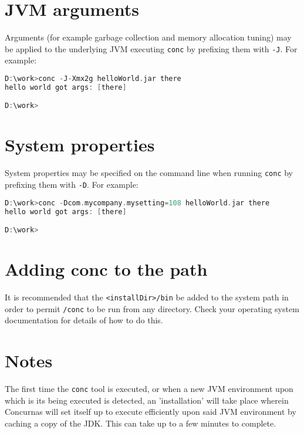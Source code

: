 \documentclass[conc-doc]{subfiles}
\begin{document}
\section{JVM arguments}
Arguments (for example garbage collection and memory allocation tuning) may be applied to the underlying JVM executing \lstinline{conc} by prefixing them with \lstinline{-J}. For example:

\begin{lstlisting}[language=C]
D:\work>conc -J-Xmx2g helloWorld.jar there
hello world got args: [there]

D:\work>
\end{lstlisting}

\section{System properties}
System properties may be specified on the command line when running \lstinline{conc} by prefixing them with \lstinline{-D}. For example:

\begin{lstlisting}[language=C]
D:\work>conc -Dcom.mycompany.mysetting=108 helloWorld.jar there
hello world got args: [there]

D:\work>
\end{lstlisting}

\section{Adding conc to the path}
It is recommended that the \lstinline{<installDir>/bin} be added to the system path in order to permit \lstinline{/conc} to be run from any directory. Check your operating system documentation for details of how to do this.

\section{Notes}
The first time the \lstinline{conc} tool is executed, or when a new JVM environment upon which is its being executed is detected, an 'installation' will take place wherein Concurnas will set itself up to execute efficiently upon said JVM environment by caching a copy of the JDK. This can take up to a few minutes to complete.
\end{document}
